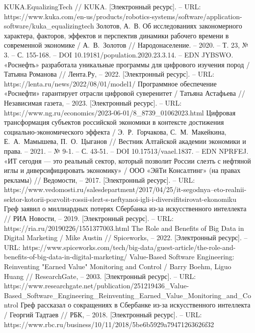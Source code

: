\documentclass{article}
\begin{document}
\begin{thebibliography}{2}
 KUKA.EqualizingTech // KUKA. [Электронный ресурс]. – URL: https://www.kuka.com/en-us/products/robotics-systems/software/application-software/kuka\_equalizingtech
 Золотов, А.~В. Об исследованиях закономерного характера, факторов, эффектов и перспектив динамики рабочего времени в современной экономике / А.~В.~Золотов // Народонаселение. – 2020. – Т. 23, № 3. – С. 155-168. – DOI 10.19181/population.2020.23.3.14. – EDN JYBSWO.
 «Роснефть» разработала уникальные программы для цифрового изучения пород / Татьяна Романова // Лента.Ру, – 2022. [Электронный ресурс]. – URL: https://lenta.ru/news/2022/08/01/model1/
 Программное обеспечение «Роснефти» гарантирует отрасли цифровой суверенитет / Татьяна Астафьева // Независимая газета, – 2023. [Электронный ресурс]. – URL: https://www.ng.ru/economics/2023-06-01/8\_8739\_01062023.html
 Цифровая трансформация субъектов российской экономики в контексте достижения социально-экономического эффекта / Э.~Р.~Горчакова, С.~М.~Макейкина, Е.~А.~Мамышева, П.~О.~Цыганов // Вестник Алтайской академии экономики и права. – 2021. – № 9-1. – С. 43-51. – DOI 10.17513/vaael.1837. – EDN NPRFEJ.
 «ИТ сегодня — это реальный сектор, который позволит России слезть с нефтяной иглы и диверсифицировать экономику» / ООО «ЭйТи Консалтинг» (на правах рекламы) // Ведомости, – 2017. [Электронный ресурс]. – URL: https://www.vedomosti.ru/salesdepartment/2017/04/25/it-segodnya--eto-realnii-sektor-kotorii-pozvolit-rossii-slezt-s-neftyanoi-igli-i-diversifitsirovat-ekonomiku
 Греф заявил о миллиардных потерях Сбербанка из-за искусственного интеллекта // РИА Новости, – 2019. [Электронный ресурс]. – URL: https://ria.ru/20190226/1551377003.html
 The Role and Benefits of Big Data in Digital Marketing / Mike Austin // Spiceworks, – 2022. [Электронный ресурс]. – URL: https://www.spiceworks.com/tech/big-data/guest-article/the-role-and-benefits-of-big-data-in-digital-marketing/
 Value-Based Software Engineering: Reinventing "Earned Value" Monitoring and Control / Barry Boehm, Liguo Huang // ResearchGate, – 2003. [Электронный ресурс]. – URL: https://www.researchgate.net/publication/251219436\_Value-Based\_Software\_Engineering\_Reinventing\_Earned\_Value\_Monitoring\_and\_Control
 Греф рассказал о сокращениях в Сбербанке из-за искусственного интеллекта / Георгий Тадтаев // РБК, – 2018. [Электронный ресурс]. – URL:  https://www.rbc.ru/business/10/11/2018/5be6b5929a79471263626f32

\end{thebibliography}
\end{document}
